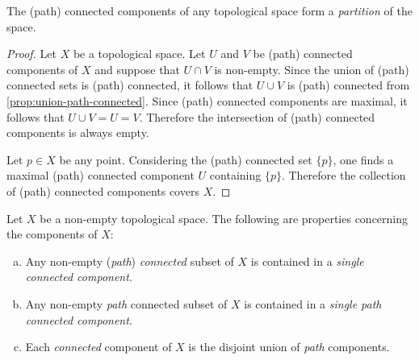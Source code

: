 \begin{proposition}
    \label{prop:connected-components-partition}
    The (path) connected components of any topological space form a \emph{partition}
    of the space.
\end{proposition}

\begin{proof}
    Let \(X\) be a topological space. Let \(U\) and \(V\) be (path) connected
    components of \(X\) and suppose that \(U \cap V\) is non-empty. Since the union
    of (path) connected sets is (path) connected, it follows that \(U \cup V\) is
    (path) connected from \cref{prop:union-path-connected}. Since (path) connected
    components are maximal, it follows that \(U \cup V = U = V\). Therefore the
    intersection of (path) connected components is always empty.

    Let \(p \in X\) be any point. Considering the (path) connected set \(\{p\}\),
    one finds a maximal (path) connected component \(U\) containing
    \(\{p\}\). Therefore the collection of (path) connected components covers \(X\).
\end{proof}

\begin{corollary}
    \label{cor:components-contained-and-unions}
    Let \(X\) be a non-empty topological space. The following are properties
    concerning the components of \(X\):
    \begin{enumerate}[(a)]\setlength\itemsep{0em}
        \item Any non-empty (\emph{path}) \emph{connected} subset of \(X\) is contained
              in a \emph{single connected component}.

        \item Any non-empty \emph{path} connected subset of \(X\) is contained in a
              \emph{single path connected component}.

        \item Each \emph{connected} component of \(X\) is the disjoint union of
              \emph{path} components.
    \end{enumerate}
\end{corollary}

